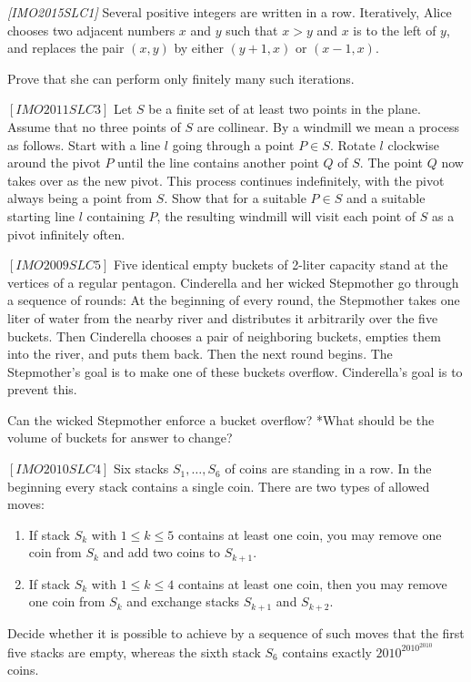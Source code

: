 \begin{problem}
\textit{[IMO2015SLC1]}
Several positive integers are written in a row. Iteratively, Alice chooses two adjacent numbers $x$ and $y$ such that $x > y$ and $x$ is to the left of $y$, and replaces the pair $(x,y)$ by either $(y + 1,x)$ or $(x − 1,x)$. 

Prove that she can perform only ﬁnitely many such iterations.
\end{problem}

\begin{problem}
$[IMO2011SLC3]$
Let $S$ be a ﬁnite set of at least two points in the plane. Assume that no three points of $S$ are collinear. By a windmill we mean a process as follows. Start with a line $l$ going through a point $P \in S$. Rotate $l$ clockwise around the pivot $P$ until the line contains another point $Q$ of $S$. The point $Q$ now takes over as the new pivot. This process continues indeﬁnitely, with the pivot always being a point from $S$. Show that for a suitable $P \in S$ and a suitable starting line $l$ containing $P$, the resulting windmill will visit each point of $S$ as a pivot inﬁnitely often.

\end{problem}

\begin{problem}
$[IMO2009SLC5]$
Five identical empty buckets of 2-liter capacity stand at the vertices of a regular pentagon. Cinderella and her wicked Stepmother go through a sequence of rounds: At the beginning of every round, the Stepmother takes one liter of water from the nearby river and distributes it arbitrarily over the ﬁve buckets. Then Cinderella chooses a pair of neighboring buckets, empties them into the river, and puts them back. Then the next round begins. The Stepmother’s goal is to make one of these buckets overﬂow. Cinderella’s goal is to prevent this. 

Can the wicked Stepmother enforce a bucket overﬂow?  *What should be the volume of buckets for answer to change?

\end{problem}

\begin{problem}
$[IMO2010SLC4]$
Six stacks $S_1,\dots,S_6$ of coins are standing in a row. In the beginning every stack contains a single coin. There are two types of allowed moves: 
\begin{enumerate}
\item \label{move1} If stack $S_k$ with $1\le k \le 5$ contains at least one coin, you may remove one coin from $S_k$ and add two coins to $S_{k+1}$.
\item If stack $S_k$ with $1 \le k \le 4$ contains at least one coin, then you may remove one coin from $S_k$ and exchange stacks $S_{k+1}$ and $S_{k+2}$. 
 \end{enumerate}
 Decide whether it is possible to achieve by a sequence of such moves that the ﬁrst ﬁve stacks are empty, whereas the sixth stack $S_6$ contains exactly $2010^{2010^{2010}}$ coins.

\end{problem}

